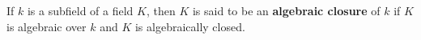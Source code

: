 If $k$ is a subfield of a field $K$, then $K$ is said to be an \textbf{algebraic closure} of $k$ if $K$ is algebraic over $k$ and $K$ is algebraically closed.
